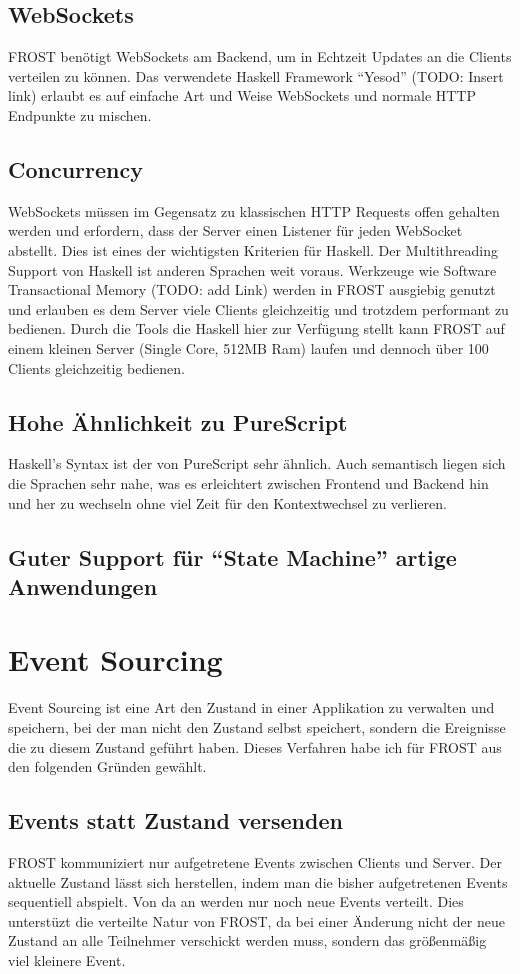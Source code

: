 \subsection*{WebSockets}
FROST benötigt WebSockets am Backend, um in Echtzeit Updates an die Clients
verteilen zu können. Das verwendete Haskell Framework ``Yesod'' (TODO: Insert link)
erlaubt es auf einfache Art und Weise WebSockets und normale HTTP Endpunkte zu
mischen. 

\subsection*{Concurrency}
WebSockets müssen im Gegensatz zu klassischen HTTP Requests offen
gehalten werden und erfordern, dass der Server einen Listener für jeden
WebSocket abstellt. 
Dies ist eines der wichtigsten Kriterien für Haskell. Der Multithreading Support
von Haskell ist anderen Sprachen weit voraus. Werkzeuge wie Software
Transactional Memory (TODO: add Link) werden in FROST ausgiebig genutzt und
erlauben es dem Server viele Clients gleichzeitig und trotzdem performant zu
bedienen. Durch die Tools die Haskell hier zur Verfügung stellt kann
FROST auf einem kleinen Server (Single Core, 512MB Ram) laufen und dennoch über
100 Clients gleichzeitig bedienen.

\subsection*{Hohe Ähnlichkeit zu PureScript}
Haskell's Syntax ist der von PureScript sehr ähnlich. Auch semantisch liegen
sich die Sprachen sehr nahe, was es erleichtert zwischen Frontend und Backend
hin und her zu wechseln ohne viel Zeit für den Kontextwechsel zu verlieren.

\subsection*{Guter Support für ``State Machine'' artige Anwendungen}

\section{Event Sourcing}
Event Sourcing ist eine Art den Zustand in einer Applikation zu verwalten und
speichern, bei der man nicht den Zustand selbst speichert, sondern die
Ereignisse die zu diesem Zustand geführt haben. Dieses Verfahren habe ich für
FROST aus den folgenden Gründen gewählt.

\subsection*{Events statt Zustand versenden}
FROST kommuniziert nur aufgetretene Events zwischen Clients und Server. Der
aktuelle Zustand lässt sich herstellen, indem man die bisher aufgetretenen
Events sequentiell abspielt. Von da an werden nur noch neue Events verteilt.
Dies unterstüzt die verteilte Natur von FROST, da bei einer Änderung nicht der
neue Zustand an alle Teilnehmer verschickt werden muss, sondern das größenmäßig
viel kleinere Event.

